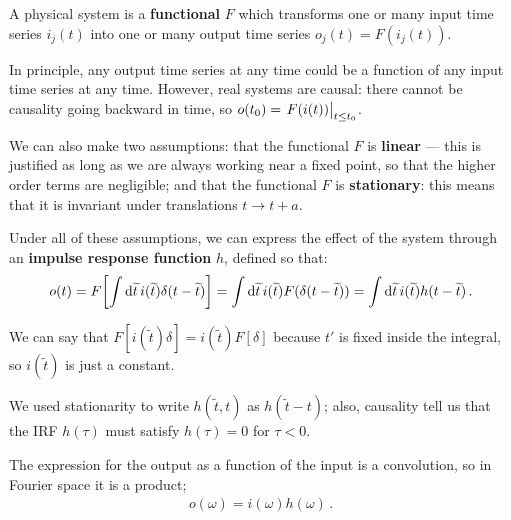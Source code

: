 \documentclass[main.tex]{subfiles}
\begin{document}


A physical system is a \textbf{functional} \(F\) which transforms one or many input time series \(i_j (t)\) into one or many output time series \(o_j (t) = F(i_j(t))\). 

In principle, any output time series at any time could be a function of any input time series at any time.
However, real systems are causal: there cannot be causality going backward in time, so \(o(t_0 ) = \eval{F (i(t))}_{t \leq t_0 }\). 

We can also make two assumptions: that the functional \(F\) is \textbf{linear} --- this is justified as long as we are always working near a fixed point, so that the higher order terms are negligible; and that the functional \(F\) is \textbf{stationary}: this means that it is invariant under translations \(t \to t + a\).

Under all of these assumptions, we can express the effect of the system through an \textbf{impulse response function} \(h\), defined so that: 
%
\begin{align}
o(t) = F \qty[\int \dd{\widetilde{t}} i (\widetilde{t}) \delta(t - \widetilde{t})]
= \int \dd{\widetilde{t}} i(\widetilde{t}) F( \delta (t - \widetilde{t})) 
= \int \dd{\widetilde{t}} i(\widetilde{t}) h(t - \widetilde{t})
\,.
\end{align}

We can say that \(F[i(\widetilde{t}) \delta] = i(\widetilde{t}) F[\delta ]\) because \(t'\) is fixed inside the integral, so \(i(\widetilde{t})\) is just a constant. 

We used stationarity to write \(h(\widetilde{t}, t)\) as \(h( \widetilde{t} - t)\); also, causality tell us that the IRF \(h(\tau )\) must satisfy \(h(\tau ) = 0\) for \(\tau < 0\).

The expression for the output as a function of the input is a convolution, so in Fourier space it is a product;
%
\begin{align}
o(\omega ) = i(\omega ) h(\omega )
\,.
\end{align}
\end{document}
